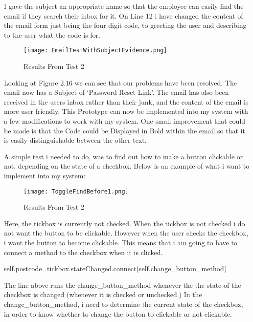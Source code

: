 I gave the subject an appropriate name so that the employee can easily find the email if they search their inbox for it. On Line 12 i have changed the content of the email form just being the four digit code, to greeting the user and describing to the user what the code is for. \par

\begin{figure}[H]
\caption{Results From Test 2} \label{fig:Results From Test 2}
\hfill\texttt{[image: EmailTestWithSubjectEvidence.png]}\hspace*{\fill}
\end{figure}

Looking at Figure 2.16 we can see that our problems have been resolved. The email now has a Subject of `Password Reset Link'. The email has also been received in the users inbox rather than their junk, and the content of the email is more user friendly. This Prototype can now be implemented into my system with a few modifications to work with my system. One small improvement that could be made is that the Code could be Displayed in Bold within the email so that it is easily distinguishable between the other text. \par
\pagebreak


A simple test i needed to do, was to find out how to make a button clickable or not, depending on the state of a checkbox. Below is an example of what i want to implement into my system:

\begin{figure}[H]
\caption{Results From Test 2} \label{fig:Results From Test 2}
\hfill\texttt{[image: ToggleFindBefore1.png]}\hspace*{\fill}
\end{figure}

Here, the tickbox is currently not checked. When the tickbox is not checked i do not want the button to be clickable. However when the user checks the checkbox, i want the button to become clickable. This means that i am going to have to connect a method to the checkbox when it is clicked.
\begin{python}
self.postcode_tickbox.stateChanged.connect(self.change_button_method)
\end{python}
The line above runs the change_button_method whenever the the state of the checkbox is changed (whenever it is checked or unchecked.) In the change_button_method, i need to determine the current state of the checkbox, in order to know whether to change the button to clickable or not clickable.

